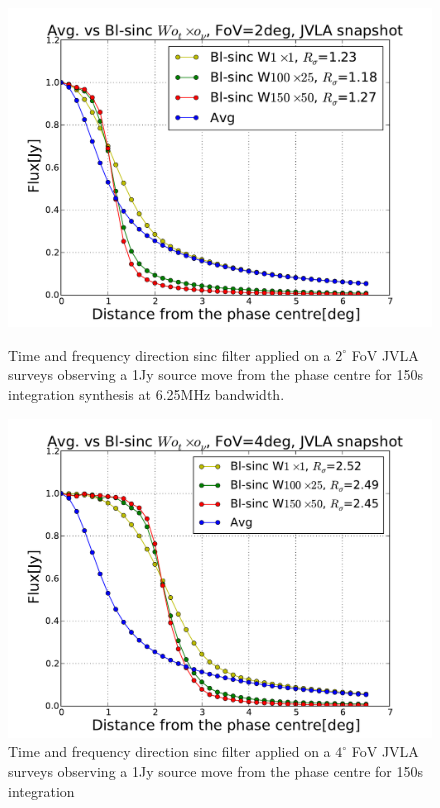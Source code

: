 \documentclass[useAMS,usenatbib]{mn2e}
\begin{document}
\begin{figure}
  \centering
\begin{minipage}{0.36\linewidth}\includegraphics[width=1\textwidth]{./Figures/Bl-sinc-FoV2-vla.pdf}\caption{Time and frequency 
direction sinc filter applied on a $2^{\circ}$ FoV JVLA surveys observing a 1Jy source move from the phase centre for 150s integration 
synthesis at 6.25MHz bandwidth.}\label{fig:Bl-sinc-FoV2}\end{minipage}
\hspace{1cm}
\begin{minipage}{0.36\linewidth}\includegraphics[width=1\textwidth]{./Figures/Bl-sinc-FoV4-vla.pdf}\caption{Time and frequency 
direction sinc filter applied on a $4^{\circ}$ FoV JVLA surveys observing a 1Jy source move from the phase centre for 150s integration 
}
\end{minipage}
\end{figure}
\end{document}
